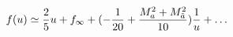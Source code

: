 \begin{equation} f(u) \simeq \frac{2}{5} u +f_{\infty}+(-\frac{1}{20}+\frac{M_a^2+M_{\tilde{a}}^2}{10}) \frac{1}{u}+\ldots\\[1mm] \end{equation}

